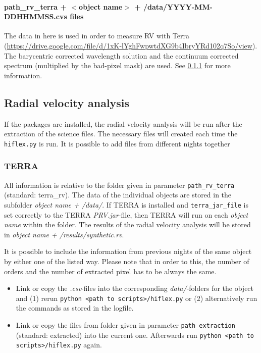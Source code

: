 \documentclass[10pt,a4paper]{article}
\begin{document}
\paragraph{path\_rv\_terra + $<$object name$>$ + /data/YYYY-MM-DDHHMMSS.cvs files}
The data in here is used in order to measure RV with Terra (\url{https://drive.google.com/file/d/1xK-lYghFwpwtdXG9b4IbryYRd102q7So/view}). The barycentric corrected wavelength solution and the continuum corrected spectrum (multiplied by the bad-pixel mask) are used. See \ref{Section:files_folders_rv_for_terra} for more information.



\subsection{Radial velocity analysis}
If the packages are installed, the radial velocity analysis will be run after the extraction of the science files. The necessary files will created each time the \verb|hiflex.py| is run. It is possible to add files from different nights together

\subsubsection{TERRA}
\label{Section:files_folders_rv_for_terra}
All information is relative to the folder given in parameter \verb|path_rv_terra| (standard: terra\_rv). 
The data of the individual objects are stored in the subfolder \textit{object name + /data/}. If TERRA is installed and \verb|terra_jar_file| is set correctly to the TERRA \textit{PRV.jar}-file, then TERRA will run on each \textit{object name} within the folder. The results of the radial velocity analysis will be stored in \textit{object name + /results/synthetic.rv}.

It is possible to include the information from previous nights of the same object by either one of the listed way. Please note that in order to this, the number of orders and the number of extracted pixel has to be always the same.
\begin{itemize}
  \item Link or copy the \textit{.csv}-files into the corresponding \textit{data/}-folders for the object and (1) rerun \verb|python <path to scripts>/hiflex.py| or (2) alternatively run the commands as stored in the logfile.
  \item Link or copy the files from folder given in parameter \verb|path_extraction| (standard: extracted) into the current one. Afterwards run \verb|python <path to scripts>/hiflex.py| again.
\end{itemize}
\end{document}
